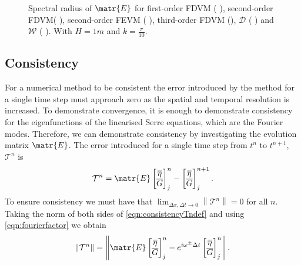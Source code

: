 \begin{figure}
\begin{subfigure}{0.5\textwidth}
	\end{subfigure}
	\caption{Spectral radius of $\matr{E}$ for first-order FDVM ({\color{green!60!black} \solidrule}), second-order FDVM({\color{red} \solidrule}), second-order FEVM ({\color{blue} \solidrule}), third-order FDVM ({\solidrule}), $\mathcal{D}$ ({\color{violet!80!white} \solidrule}) and $\mathcal{W}$ ({\color{orange} \solidrule}). With $H = 1m$ and $k = \frac{\pi}{10}$.}
	\label{fig:StabShall}
\end{figure}




\subsection{Consistency}
For a numerical method to be consistent the error introduced by the method for a single time step must approach zero as the spatial and temporal resolution is increased. To demonstrate convergence, it is enough to demonstrate consistency for the eigenfunctions of the linearised Serre equations, which are the Fourier modes. Therefore, we can demonstrate consistency by investigating the evolution matrix $\matr{E}$. The error introduced for a single time step from $t^n$ to $t^{n+1}$, $\mathcal{T}^n$ is
\begin{equation}
\mathcal{T}^n =  \matr{E}\begin{bmatrix}
\overline{\eta} \\ \overline{G}
\end{bmatrix}^{n}_j -  \begin{bmatrix}
\overline{\eta} \\ \overline{G}
\end{bmatrix}^{n+1}_j.
\label{eqn:consistencyTndef}
\end{equation}
To ensure consistency we must have that $ \lim_{\Delta x,\Delta t \rightarrow 0}\left \| \mathcal{T}^n \right \| = 0 $ for all $n$. Taking the norm of both sides of \eqref{eqn:consistencyTndef} and using \eqref{eqn:fourierfactor}  we obtain
\begin{equation*}
\left \|\mathcal{T}^n \right \| = \left \|  \matr{E}\begin{bmatrix}
\overline{\eta} \\ \overline{G}
\end{bmatrix}^{n}_j -  e^{i \omega^\pm \Delta t} \begin{bmatrix}
\overline{\eta} \\ \overline{G}
\end{bmatrix}^{n}_j \right \|.
\end{equation*}
